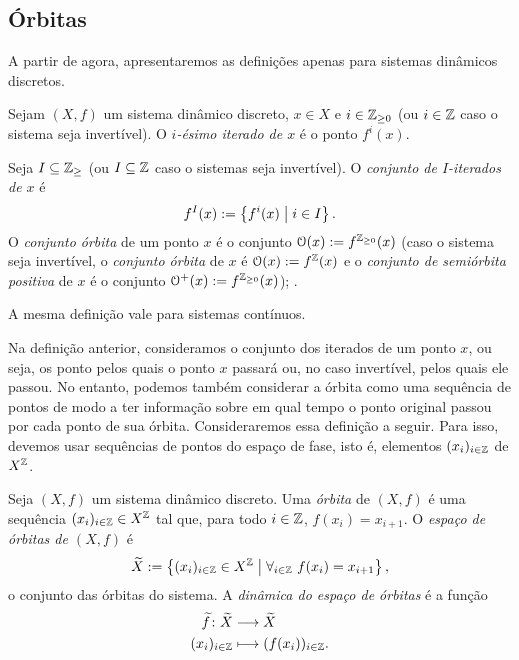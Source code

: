 \subsection{Órbitas}

A partir de agora, apresentaremos as definições apenas para sistemas dinâmicos discretos.

\begin{definition}
Sejam $(X,f)$ um sistema dinâmico discreto, $x \in X$ e $i \in \mathbb{Z}_{\geq 0}$ (ou $i \in \mathbb{Z}$ caso o sistema seja invertível). O \emph{$i$-ésimo iterado de $x$} é o ponto $f^i(x)$.

Seja $I \subseteq \mathbb{Z}_{\geq}$ (ou $I \subseteq \mathbb{Z}$ caso o sistemas seja invertível). O \emph{conjunto de $I$-iterados de $x$} é
	\begin{equation*}
	f^I(x) := \left\{{f^i(x)}\;\middle\vert\;{i \in I}\right\}.
	\end{equation*}
O \emph{conjunto órbita} de um ponto $x$ é o conjunto $\mathcal{O}(x) := f^{\mathbb{Z}_{\geq 0}}(x)$ (caso o sistema seja invertível, o \emph{conjunto órbita} de $x$ é $\mathcal{O}(x) := f^{\mathbb{Z}}(x)$ e o \emph{conjunto de semiórbita positiva} de $x$ é o conjunto $\mathcal{O}^+(x) := f^{\mathbb{Z}_{\geq 0}}(x)$); .
\end{definition}
A mesma definição vale para sistemas contínuos.


Na definição anterior, consideramos o conjunto dos iterados de um ponto $x$, ou seja, os ponto pelos quais o ponto $x$ passará ou, no caso invertível, pelos quais ele passou. No entanto, podemos também considerar a órbita como uma sequência de pontos de modo a ter informação sobre em qual tempo o ponto original passou por cada ponto de sua órbita. Consideraremos essa definição a seguir. Para isso, devemos usar sequências de pontos do espaço de fase, isto é, elementos $(x_i)_{i \in \mathbb{Z}}$ de $X^{\mathbb{Z}}$.

\begin{definition}
Seja $(X,f)$ um sistema dinâmico discreto. Uma \emph{órbita} de $(X,f)$ é uma sequência $(x_i)_{i \in \mathbb{Z}} \in X^{\mathbb{Z}}$ tal que, para todo $i \in \mathbb{Z}$, $f(x_i) = x_{i+1}$. O \emph{espaço de órbitas de $(X,f)$} é
	\begin{equation*}
	\widetilde{X} := \left\{{(x_i)_{i \in \mathbb{Z}} \in X^{\mathbb{Z}}}\;\middle\vert\;{\forall_{i \in \mathbb{Z}}\ f(x_i) = x_{i+1}}\right\},
	\end{equation*}
o conjunto das órbitas do sistema. A \emph{dinâmica do espaço de órbitas} é a função
	\begin{align*}
	{\widetilde{f}}\colon {\widetilde{X}} &\longrightarrow {\widetilde{X}} \\{(x_i)_{i \in \mathbb{Z}}} &\longmapsto (f(x_i))_{i \in \mathbb{Z}}.
	\end{align*}
\end{definition}

